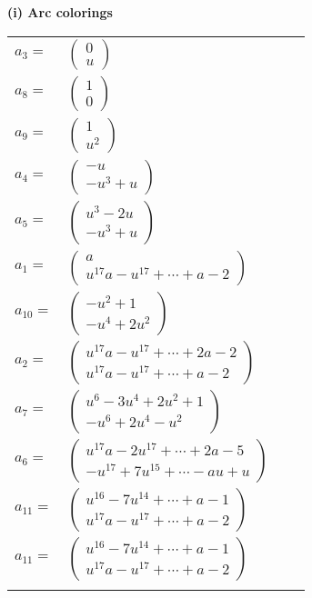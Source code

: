 \documentclass[1p]{elsarticle_modified}
\theoremstyle{definition}
\begin{document}
\flushleft \textbf{(i) Arc colorings}\\
\begin{tabular}{m{7pt} m{180pt} m{7pt} m{180pt} }
\flushright $a_{3}=$&$\begin{pmatrix}0\\u\end{pmatrix}$ \\
\flushright $a_{8}=$&$\begin{pmatrix}1\\0\end{pmatrix}$ \\
\flushright $a_{9}=$&$\begin{pmatrix}1\\u^2\end{pmatrix}$ \\
\flushright $a_{4}=$&$\begin{pmatrix}- u\\- u^3+u\end{pmatrix}$ \\
\flushright $a_{5}=$&$\begin{pmatrix}u^3-2 u\\- u^3+u\end{pmatrix}$ \\
\flushright $a_{1}=$&$\begin{pmatrix}a\\u^{17} a- u^{17}+\cdots+a-2\end{pmatrix}$ \\
\flushright $a_{10}=$&$\begin{pmatrix}- u^2+1\\- u^4+2 u^2\end{pmatrix}$ \\
\flushright $a_{2}=$&$\begin{pmatrix}u^{17} a- u^{17}+\cdots+2 a-2\\u^{17} a- u^{17}+\cdots+a-2\end{pmatrix}$ \\
\flushright $a_{7}=$&$\begin{pmatrix}u^6-3 u^4+2 u^2+1\\- u^6+2 u^4- u^2\end{pmatrix}$ \\
\flushright $a_{6}=$&$\begin{pmatrix}u^{17} a-2 u^{17}+\cdots+2 a-5\\- u^{17}+7 u^{15}+\cdots- a u+u\end{pmatrix}$ \\
\flushright $a_{11}=$&$\begin{pmatrix}u^{16}-7 u^{14}+\cdots+a-1\\u^{17} a- u^{17}+\cdots+a-2\end{pmatrix}$\\ \flushright $a_{11}=$&$\begin{pmatrix}u^{16}-7 u^{14}+\cdots+a-1\\u^{17} a- u^{17}+\cdots+a-2\end{pmatrix}$\\&\end{tabular}
\end{document}
